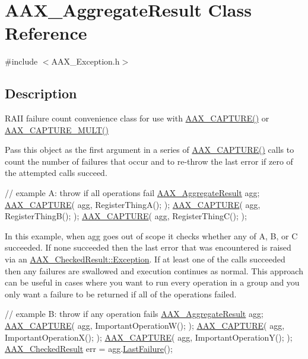 \hypertarget{a00009}{}\section{A\+A\+X\+\_\+\+Aggregate\+Result Class Reference}
\label{a00009}


{\ttfamily \#include $<$A\+A\+X\+\_\+\+Exception.\+h$>$}



\subsection{Description}
R\+A\+I\+I failure count convenience class for use with \hyperlink{a00208_af9972551e4546e894010f99eade68c94}{A\+A\+X\+\_\+\+C\+A\+P\+T\+U\+R\+E()} or \hyperlink{a00208_a078be92d3d19a5a4b3da2b55ae5ac1c9}{A\+A\+X\+\_\+\+C\+A\+P\+T\+U\+R\+E\+\_\+\+M\+U\+L\+T()}

Pass this object as the first argument in a series of \hyperlink{a00208_af9972551e4546e894010f99eade68c94}{A\+A\+X\+\_\+\+C\+A\+P\+T\+U\+R\+E()} calls to count the number of failures that occur and to re-\/throw the last error if zero of the attempted calls succeed.


\begin{DoxyCode}
\textcolor{comment}{// example A: throw if all operations fail}
\hyperlink{a00009}{AAX\_AggregateResult} agg;
\hyperlink{a00208_af9972551e4546e894010f99eade68c94}{AAX\_CAPTURE}( agg, RegisterThingA(); );
\hyperlink{a00208_af9972551e4546e894010f99eade68c94}{AAX\_CAPTURE}( agg, RegisterThingB(); );
\hyperlink{a00208_af9972551e4546e894010f99eade68c94}{AAX\_CAPTURE}( agg, RegisterThingC(); );
\end{DoxyCode}


In this example, when {\ttfamily agg} goes out of scope it checks whether any of A, B, or C succeeded. If none succeeded then the last error that was encountered is raised via an \hyperlink{a00019_a36fd71afc6d62993c1dd96e1ca9fcc0e}{A\+A\+X\+\_\+\+Checked\+Result\+::\+Exception}. If at least one of the calls succeeded then any failures are swallowed and execution continues as normal. This approach can be useful in cases where you want to run every operation in a group and you only want a failure to be returned if all of the operations failed.


\begin{DoxyCode}
\textcolor{comment}{// example B: throw if any operation fails}
\hyperlink{a00009}{AAX\_AggregateResult} agg;
\hyperlink{a00208_af9972551e4546e894010f99eade68c94}{AAX\_CAPTURE}( agg, ImportantOperationW(); );
\hyperlink{a00208_af9972551e4546e894010f99eade68c94}{AAX\_CAPTURE}( agg, ImportantOperationX(); );
\hyperlink{a00208_af9972551e4546e894010f99eade68c94}{AAX\_CAPTURE}( agg, ImportantOperationY(); );
\hyperlink{a00019}{AAX\_CheckedResult} err = agg.\hyperlink{a00009_aedeb567f840d34ad2332c92f248efe6e}{LastFailure}();
\end{DoxyCode}


